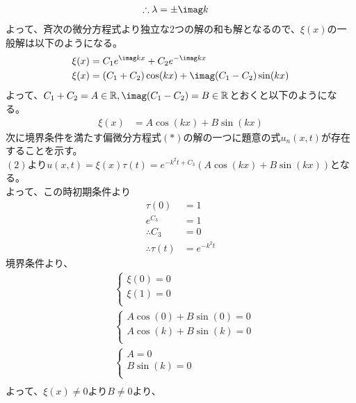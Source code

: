 \begin{enumerate}[(1)]
\begin{align*}
            \therefore \lambda &= \pm \imag k
        \end{align*}
    よって、斉次の微分方程式より独立な2つの解の和も解となるので、$\xi(x)$の一般解は以下のようになる。
        \begin{align*}
            \xi (x) &= C_1 e^{\imag kx} + C_2 e^{-\imag kx}\\
            \xi (x) &= (C_1 + C_2)\cos (kx) + \imag(C_1 - C_2)\sin (kx)
        \end{align*}
        よって、$C_1 + C_2 = A \in \mathbb{R}, \imag(C_1 - C_2) = B\in\mathbb{R}$とおくと以下のようになる。
        \begin{align*}
            \xi (x) &= A\cos (kx) + B\sin (kx)
        \end{align*}
        次に境界条件を満たす偏微分方程式$(*)$の解の一つに題意の式$u_n(x, t)$が存在することを示す。\\
        $(2)$より$u(x, t) = \xi (x)\tau (t) = e^{-k^2 t + C_3}(A\cos (kx) + B\sin (kx))$となる。\\
        よって、この時初期条件より
        \begin{align*}
            \tau (0) &= 1\\
            e^{C_3} &= 1\\
            \therefore C_3 &= 0\\
            \therefore \tau (t) &= e^{-k^2t}
        \end{align*}
        境界条件より、
        \begin{align*}
            &\begin{cases}
                \xi(0) = 0\\
                \xi(1) = 0\\
            \end{cases}\\
            &\begin{cases}
                A\cos (0) + B\sin (0) = 0\\
                A\cos (k) + B\sin (k) = 0\\
            \end{cases}\\
            &\begin{cases}
                A = 0\\
                B\sin (k) = 0\\
            \end{cases}\\
        \end{align*}
        よって、$\xi (x) \neq 0$より$B \neq 0$より、

\end{enumerate}

